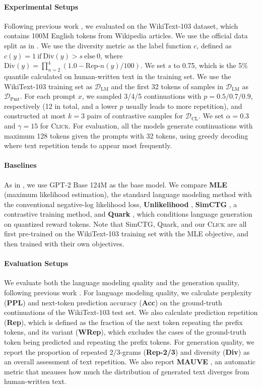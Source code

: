 \paragraph{Experimental Setups} Following previous work \cite{simctg, quark}, we evaluated on the WikiText-103 \cite{wikitext103} dataset, which contains 100M English tokens from Wikipedia articles. We use the official data split as in \cite{unlikelihood, simctg}. We use the diversity metric as the label function $c$, defined as $c(y) = 1 \ \text{if}\ \text{Div}(y) > s \ \text{else}\ 0$, where $\text{Div}(y) = \prod_{n=2}^4 (1.0 - \text{Rep-}n(y)/100)$.
We set $s$ to 0.75, which is the 5\% quantile calculated on human-written text in the training set. We use the WikiText-103 training set as $\mathcal{D}_\mathrm{LM}$ and the first 32 tokens of samples in $\mathcal{D}_\mathrm{LM}$ as $\mathcal{D}_\mathrm{Pmt}$.
For each prompt $x$, we sampled 3/4/5 continuations with $p=0.5/0.7/0.9$, respectively (12 in total, and a lower $p$ usually leads to more repetition), and constructed at most $k=3$ pairs of contrastive samples for $\mathcal{D}_\mathrm{CL}$.
We set $\alpha = 0.3$ and $\gamma = 15$ for \textsc{Click}.
For evaluation, all the models generate continuations with maximum 128 tokens given the prompts with 32 tokens, using greedy decoding where text repetition tends to appear most frequently.

\paragraph{Baselines}
As in \cite{simctg, quark}, we use GPT-2 Base 124M \cite{gpt2} as the base model. We compare \textbf{MLE} (maximum likelihood estimation), the standard language modeling method with the conventional negative-log likelihood loss, \textbf{Unlikelihood} \cite{unlikelihood}, \textbf{SimCTG} \cite{simctg}, a contrastive training method, and \textbf{Quark} \cite{quark}, which conditions language generation on quantized reward tokens. Note that SimCTG, Quark, and our \textsc{Click} are all first pre-trained on the WikiText-103 training set with the MLE objective, and then trained with their own objectives.

\paragraph{Evaluation Setups} We evaluate both the language modeling quality and the generation quality, following previous work \cite{unlikelihood, simctg}. For language modeling quality, we calculate perplexity (\textbf{PPL}) and next-token prediction accuracy (\textbf{Acc}) on the ground-truth continuations of the WikiText-103 test set. We also calculate prediction repetition (\textbf{Rep}), which is defined as the fraction of the next token repeating the prefix tokens, and its variant (\textbf{WRep}), which excludes the cases of the ground-truth token being predicted and repeating the prefix tokens. For generation quality, we report the proportion of repeated 2/3-grams (\textbf{Rep-2/3}) and diversity (\textbf{Div}) as an overall assessment of text repetition. We also report \textbf{MAUVE} \cite{mauve}, an automatic metric that meauses how much the distribution of generated text diverges from human-written text.

